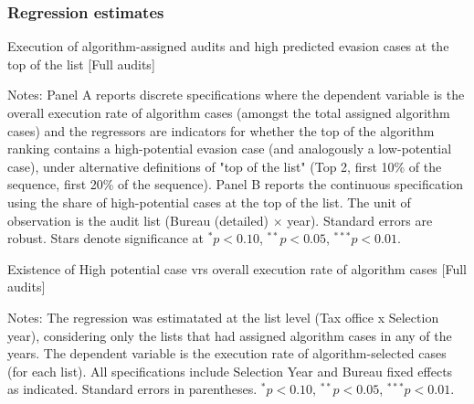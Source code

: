 \documentclass{article}
\newcommand{\OutPath}{Output/}%
\newcommand{\OutPath}{../Output/}%
\begin{document}
\begin{landscape}
\subsubsection{Regression estimates}

    
\begin{table}[H]\centering
\begin{threeparttable}
\caption{Execution of algorithm-assigned audits and high predicted evasion cases at the top of the list [Full audits]}
\label{tab:exec_rate_full_panels}

\footnotesize


\begin{tablenotes}[flushleft]
\footnotesize
\item Notes: Panel A reports discrete specifications where the dependent variable is the overall execution rate of algorithm cases (amongst the total assigned algorithm cases) and the  regressors are indicators for whether the top of the algorithm ranking contains a high-potential evasion case (and analogously a low-potential case), under alternative definitions of "top of the list" (Top 2, first 10\% of the sequence, first 20\% of the sequence). Panel B reports the continuous specification using the share of high-potential cases at the top of the list. The unit of observation is the audit list (Bureau (detailed)  $\times$ year). Standard errors are robust. Stars denote significance at $^{*}p<0.10$, $^{**}p<0.05$, $^{***}p<0.01$.
\end{tablenotes}
\end{threeparttable}
\end{table}

\begin{table}[H]\centering
\begin{adjustbox}{max width=1.255\textwidth}
\begin{threeparttable}

\caption{Existence of High potential case vrs overall execution rate of algorithm cases [Full audits]}
\label{tab:inspector_effort_disc_full}



\begin{tablenotes}[flushleft]
\footnotesize
\item Notes: The regression was estimatated at the list level (Tax office x Selection year), considering only the lists that had assigned algorithm cases in any of the years. The dependent variable is the execution rate of algorithm-selected cases (for each list). All specifications include Selection Year and Bureau fixed effects as indicated. Standard errors in parentheses. 
$^{*}p<0.10$, $^{**}p<0.05$, $^{***}p<0.01$.
\end{tablenotes}
\end{threeparttable}
\end{adjustbox}
\end{table}


\end{landscape}
\end{document}
